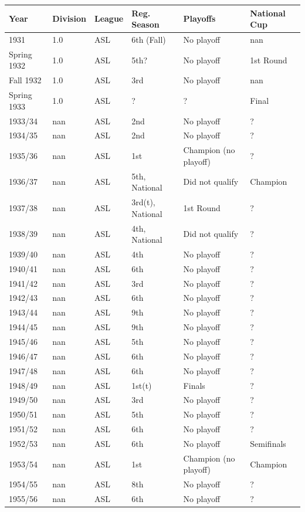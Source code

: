 \documentclass{article}
\begin{document}
\begin{tabular}{llllll}
\toprule
Year & Division & League & Reg. Season & Playoffs & National Cup \\
\midrule
1931 & 1.0 & ASL & 6th (Fall) & No playoff & nan \\
Spring 1932 & 1.0 & ASL & 5th? & No playoff & 1st Round \\
Fall 1932 & 1.0 & ASL & 3rd & No playoff & nan \\
Spring 1933 & 1.0 & ASL & ? & ? & Final \\
1933/34 & nan & ASL & 2nd & No playoff & ? \\
1934/35 & nan & ASL & 2nd & No playoff & ? \\
1935/36 & nan & ASL & 1st & Champion (no playoff) & ? \\
1936/37 & nan & ASL & 5th, National & Did not qualify & Champion \\
1937/38 & nan & ASL & 3rd(t), National & 1st Round & ? \\
1938/39 & nan & ASL & 4th, National & Did not qualify & ? \\
1939/40 & nan & ASL & 4th & No playoff & ? \\
1940/41 & nan & ASL & 6th & No playoff & ? \\
1941/42 & nan & ASL & 3rd & No playoff & ? \\
1942/43 & nan & ASL & 6th & No playoff & ? \\
1943/44 & nan & ASL & 9th & No playoff & ? \\
1944/45 & nan & ASL & 9th & No playoff & ? \\
1945/46 & nan & ASL & 5th & No playoff & ? \\
1946/47 & nan & ASL & 6th & No playoff & ? \\
1947/48 & nan & ASL & 6th & No playoff & ? \\
1948/49 & nan & ASL & 1st(t) & Finals & ? \\
1949/50 & nan & ASL & 3rd & No playoff & ? \\
1950/51 & nan & ASL & 5th & No playoff & ? \\
1951/52 & nan & ASL & 6th & No playoff & ? \\
1952/53 & nan & ASL & 6th & No playoff & Semifinals \\
1953/54 & nan & ASL & 1st & Champion (no playoff) & Champion \\
1954/55 & nan & ASL & 8th & No playoff & ? \\
1955/56 & nan & ASL & 6th & No playoff & ? \\
\bottomrule
\end{tabular}
\end{document}

